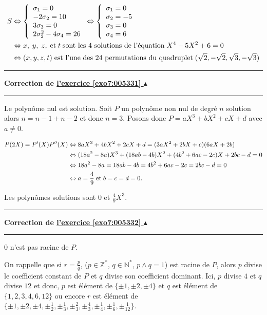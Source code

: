 \documentclass[11pt,a4paper]{article}
\newcommand{\Nn}{\mathbb{N}} \newcommand{\N}{\mathbb{N}}
\newcommand{\Zz}{\mathbb{Z}} \newcommand{\Z}{\mathbb{Z}}
\newcounter{exo}
\newcommand{\correction}[1]{\hypertarget{cor7:#1}{}\label{cor7:#1}{\bf Correction de \hyperlink{exo7:#1}{l'exercice \ref{exo7:#1} $\blacktriangle$}}\vspace{1mm}\hrule\vspace{1mm}}
\newcommand{\fincorrection}{\vspace{1mm}\hrule\vspace*{7mm}}
\begin{document}
\begin{enumerate}
\begin{align*}\ensuremath
S&\Leftrightarrow
\left\{
\begin{array}{l}
\sigma_1=0\\
-2\sigma_2=10\\
3\sigma_3=0\\
2\sigma_2^2-4\sigma_4=26
\end{array}
\right.\Leftrightarrow\left\{
\begin{array}{l}
\sigma_1=0\\
\sigma_2=-5\\
\sigma_3=0\\
\sigma_4=6
\end{array}
\right.\\
 &\Leftrightarrow x,\;y,\;z,\;\mbox{et}\;t\;\mbox{sont les 4 solutions de l'équation}\;X^4-5X^2+6=0\\
 &\Leftrightarrow(x,y,z,t)\;\mbox{est l'une des 24 permutations du quadruplet}\;(\sqrt{2},-\sqrt{2},\sqrt{3},-\sqrt{3})
\end{align*}

\end{enumerate}
\fincorrection
\correction{005331}
Le polynôme nul est solution. Soit $P$ un polynôme non nul de degré $n$ solution alors $n=n-1+n-2$ et donc $n=3$. Posons donc $P=aX^3+bX^2+cX+d$ avec $a\neq0$.

\begin{align*}\ensuremath
P(2X)=P'(X)P''(X)&\Leftrightarrow8aX^3+4bX^2+2cX+d=(3aX^2+2bX+c)(6aX+2b)\\
 &\Leftrightarrow(18a^2-8a)X^3+(18ab-4b)X^2+(4b^2+6ac-2c)X+2bc-d=0\\
 &\Leftrightarrow18a^2-8a=18ab-4b=4b^2+6ac-2c=2bc-d=0\\
 &\Leftrightarrow a=\frac{4}{9}\;\mbox{et}\;b=c=d=0.
\end{align*}

Les polynômes solutions sont $0$ et $\frac{4}{9}X^3$.

\fincorrection
\correction{005332}
$0$ n'est pas racine de $P$.

On rappelle que si $r=\frac{p}{q}$, ($p\in\Zz^*$, $q\in\Nn^*$, $p\wedge q=1$) est racine de $P$, alors $p$ divise le coefficient constant de $P$ et $q$ divise son coefficient dominant. Ici, $p$ divise $4$ et $q$ divise $12$ et donc, $p$ est élément de $\{\pm1,\pm2,\pm4\}$ et $q$ est élément 
de $\{1,2,3,4,6,12\}$ ou encore $r$ est élément de $\{\pm1,\pm2,\pm4,\pm\frac{1}{2},\pm\frac{1}{3},\pm\frac{2}{3},\pm\frac{4}{3},\pm\frac{1}{4},\pm\frac{1}{6},\pm\frac{1}{12}\}$.
\end{document}
